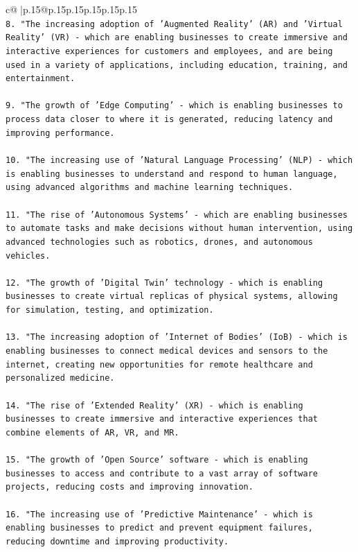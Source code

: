 \documentclass{article}
\begin{document}
{\begin{supertabular}{c@{$\;$}|p{.15\linewidth}@{}p{.15\linewidth}p{.15\linewidth}p{.15\linewidth}p{.15\linewidth}p{.15\linewidth}}
{{{\\ 
\texttt{8. "The increasing adoption of 'Augmented Reality' (AR) and 'Virtual Reality' (VR) {-} which are enabling businesses to create immersive and interactive experiences for customers and employees, and are being used in a variety of applications, including education, training, and entertainment.} \\
\\ 
\texttt{9. "The growth of 'Edge Computing' {-} which is enabling businesses to process data closer to where it is generated, reducing latency and improving performance.} \\
\\ 
\texttt{10. "The increasing use of 'Natural Language Processing' (NLP) {-} which is enabling businesses to understand and respond to human language, using advanced algorithms and machine learning techniques.} \\
\\ 
\texttt{11. "The rise of 'Autonomous Systems' {-} which are enabling businesses to automate tasks and make decisions without human intervention, using advanced technologies such as robotics, drones, and autonomous vehicles.} \\
\\ 
\texttt{12. "The growth of 'Digital Twin' technology {-} which is enabling businesses to create virtual replicas of physical systems, allowing for simulation, testing, and optimization.} \\
\\ 
\texttt{13. "The increasing adoption of 'Internet of Bodies' (IoB) {-} which is enabling businesses to connect medical devices and sensors to the internet, creating new opportunities for remote healthcare and personalized medicine.} \\
\\ 
\texttt{14. "The rise of 'Extended Reality' (XR) {-} which is enabling businesses to create immersive and interactive experiences that combine elements of AR, VR, and MR.} \\
\\ 
\texttt{15. "The growth of 'Open Source' software {-} which is enabling businesses to access and contribute to a vast array of software projects, reducing costs and improving innovation.} \\
\\ 
\texttt{16. "The increasing use of 'Predictive Maintenance' {-} which is enabling businesses to predict and prevent equipment failures, reducing downtime and improving productivity.} \\
}}}
\end{supertabular}}
\end{document}
